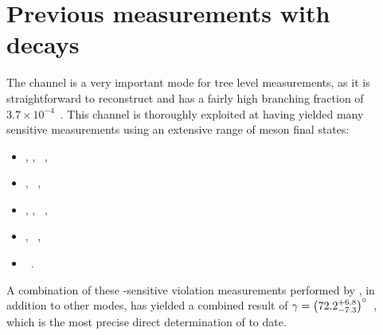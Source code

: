 \section{Previous \Pgamma measurements with  decays}


The \decay{\Bm}{\D\Km} channel is a very important mode for tree level \Pgamma measurements, as it is straightforward to reconstruct and has a fairly high branching fraction of $3.7 \times 10^{-4}$~\cite{PDG2016}. This \decay{\Bm}{\D\Km} channel is thoroughly exploited at \lhcb having yielded many \Pgamma sensitive measurements using an extensive range of \D meson final states:
\begin{itemize}
\item \decay{\D}{\Kp\pim}, \Kp\Km, \pip\pim~\cite{LHCb-PAPER-2017-021},
\item \decay{\D}{\Kp\pim\pip\pim}, \pip\pim\pip\pim~\cite{LHCb-PAPER-2016-003},
\item \decay{\D}{\Kp\pim\piz}, \Kp\Km\piz, \pip\pim\piz~\cite{LHCb-PAPER-2015-014},
\item \decay{\D}{\KS\Kp\Km}, \KS\pip\pim~\cite{LHCb-PAPER-2014-041},
\item \decay{\D}{\KS\Kp\pim}~\cite{LHCb-PAPER-2013-068}.
\end{itemize}
A combination of these \Pgamma-sensitive \CP violation measurements performed by \lhcb, in addition to other modes, has yielded a combined result of $\gamma = \left(72.2^{+6.8}_{-7.3}\right)^{\circ}$~\cite{LHCb-PAPER-2016-032}, which is the most precise direct determination of \Pgamma to date.

